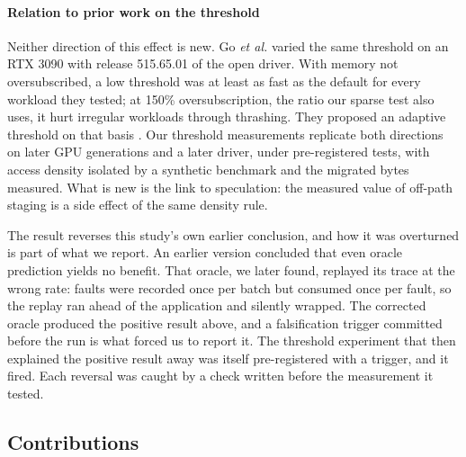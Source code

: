 \paragraph{Relation to prior work on the threshold}
Neither direction of this effect is new. Go \emph{et al.} varied the same
threshold on an RTX 3090 with release 515.65.01 of the open driver. With memory
not oversubscribed, a low threshold was at least as fast as the default for
every workload they tested; at 150\% oversubscription, the ratio our sparse
test also uses, it hurt irregular workloads through thrashing. They proposed an
adaptive threshold on that basis \cite{go2023earlyadaptor}. Our threshold
measurements replicate both directions on later GPU generations and a later
driver, under pre-registered tests, with access density isolated by a synthetic
benchmark and the migrated bytes measured. What is new is the link to
speculation: the measured value of off-path staging is a side effect of the same
density rule.

\medskip
The result reverses this study's own earlier conclusion, and how it was
overturned is part of what we report. An earlier version concluded that even
oracle prediction yields no benefit. That oracle, we later found, replayed its
trace at the wrong rate: faults were recorded once per batch but consumed once
per fault, so the replay ran ahead of the application and silently wrapped. The
corrected oracle produced the positive result above, and a falsification
trigger committed before the run is what forced us to report it. The
threshold experiment that then explained the positive result away was itself
pre-registered with a trigger, and it fired. Each reversal was caught by a check
written before the measurement it tested.

\subsection{Contributions}

